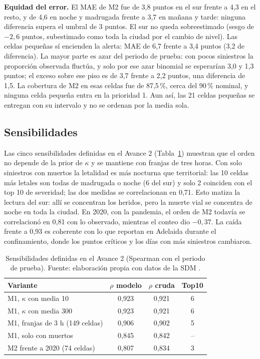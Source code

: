 \documentclass[10pt,twocolumn]{article}
\begin{document}
\textbf{Equidad del error.} El MAE de M2 fue de 3,8 puntos en el sur frente a 4,3 en el resto, y de 4,6 en noche y madrugada frente a 3,7 en mañana y tarde: ninguna diferencia supera el umbral de 3 puntos. El sur no queda sobreestimado (sesgo de $-2{,}6$ puntos, subestimado como toda la ciudad por el cambio de nivel). Las celdas pequeñas sí encienden la alerta: MAE de 6,7 frente a 3,4 puntos (3,2 de diferencia). La mayor parte es azar del periodo de prueba: con pocos siniestros la proporción observada fluctúa, y solo por ese azar binomial se esperarían 3,0 y 1,3 puntos; el exceso sobre ese piso es de 3,7 frente a 2,2 puntos, una diferencia de 1,5. La cobertura de M2 en esas celdas fue de 87,5\,\%, cerca del 90\,\% nominal, y ninguna celda pequeña entra en la prioridad 1. Aun así, las 21 celdas pequeñas se entregan con su intervalo y no se ordenan por la media sola.

\subsection{Sensibilidades}
Las cinco sensibilidades definidas en el Avance 2 (Tabla~\ref{tab:sens}) muestran que el orden no depende de la prior de $\kappa$ y se mantiene con franjas de tres horas. Con solo siniestros con muertos la letalidad es más nocturna que territorial: las 10 celdas más letales son todas de madrugada o noche (6 del sur) y solo 2 coinciden con el top 10 de severidad; las dos medidas se correlacionan en 0,71. Esto matiza la lectura del sur: allí se concentran los heridos, pero la muerte vial se concentra de noche en toda la ciudad. En 2020, con la pandemia, el orden de M2 todavía se correlacionó en 0,81 con lo observado, mientras el conteo dio $-0{,}37$. La caída frente a 0,93 es coherente con lo que \citet{soltani2023road} reportan en Adelaida durante el confinamiento, donde los puntos críticos y los días con más siniestros cambiaron.
\begin{table}[t]
\centering\small
\caption{Sensibilidades definidas en el Avance 2 (Spearman con el periodo de prueba). Fuente: elaboración propia con datos de la SDM \citep{sdm2021datos}.}\label{tab:sens}
\setlength{\tabcolsep}{3pt}
\begin{tabularx}{\columnwidth}{@{}Xccc@{}}
\toprule
Variante & $\rho$ modelo & $\rho$ cruda & Top10 \\
\midrule
M1, $\kappa$ con media 10 & 0,923 & 0,921 & 6 \\
M1, $\kappa$ con media 300 & 0,923 & 0,921 & 6 \\
M1, franjas de 3 h (149 celdas) & 0,906 & 0,902 & 5 \\
M1, solo con muertos & 0,845 & 0,842 & -- \\
M2 frente a 2020 (74 celdas) & 0,807 & 0,834 & 3 \\
\bottomrule
\end{tabularx}
\end{table}
\end{document}
